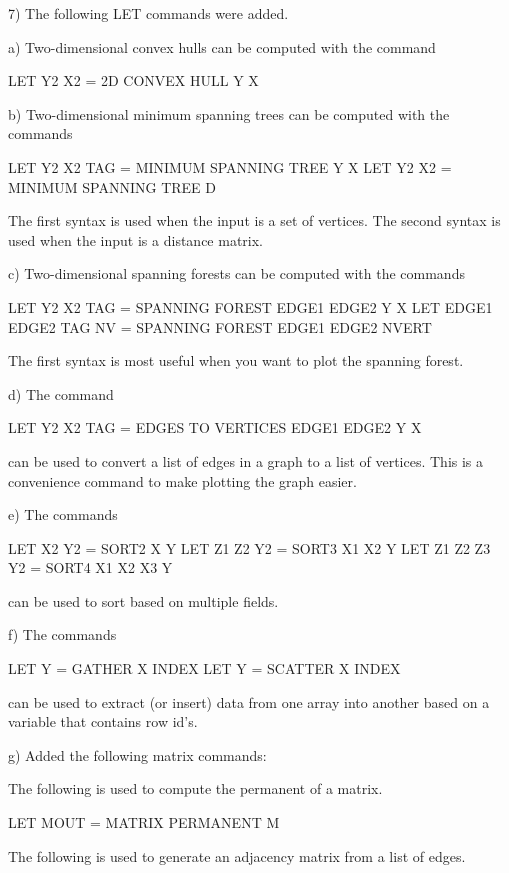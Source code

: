{ 7) The following LET commands were added.

    a) Two-dimensional convex hulls can be computed
       with the command

           LET Y2 X2 = 2D CONVEX HULL Y X

    b) Two-dimensional minimum spanning trees can be
       computed with the commands

           LET Y2 X2 TAG = MINIMUM SPANNING TREE Y X
           LET Y2 X2     = MINIMUM SPANNING TREE D
     
       The first syntax is used when the input is a set of
       vertices.   The second syntax is used when the input
       is a distance matrix.

    c) Two-dimensional spanning forests can be
       computed with the commands

           LET Y2 X2 TAG = SPANNING FOREST EDGE1 EDGE2 Y X
           LET EDGE1 EDGE2 TAG NV = SPANNING FOREST EDGE1 EDGE2 NVERT
     
       The first syntax is most useful when you want to plot
       the spanning forest.


    d) The command

           LET Y2 X2 TAG = EDGES TO VERTICES EDGE1 EDGE2 Y X

       can be used to convert a list of edges in a graph
       to a list of vertices.  This is a convenience command
       to make plotting the graph easier.

    e) The commands

          LET X2 Y2       = SORT2 X Y
          LET Z1 Z2 Y2    = SORT3 X1 X2 Y
          LET Z1 Z2 Z3 Y2 = SORT4 X1 X2 X3 Y

       can be used to sort based on multiple fields.

    f) The commands

          LET Y = GATHER X INDEX
          LET Y = SCATTER X INDEX

       can be used to extract (or insert) data from one
       array into another based on a variable that contains
       row id's.

    g) Added the following matrix commands:

       The following is used to compute the permanent of a
       matrix.

          LET MOUT = MATRIX PERMANENT M

       The following is used to generate an adjacency matrix
       from a list of edges.

}
